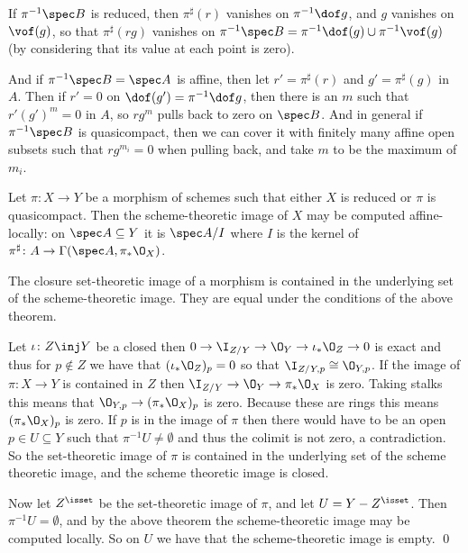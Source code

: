 If $\pi^{-1}\spec B$ is reduced, then $\pi^\sharp(r)$ vanishes on $\pi^{-1}\dof g$, and $g$ vanishes on
$\vof(g)$, so that $\pi^\sharp(rg)$ vanishes on $\pi^{-1}\spec B=\pi^{-1}\dof(g)\cup\pi^{-1}\vof(g)$
(by considering that its value at each point is zero).

And if $\pi^{-1}\spec B=\spec A$ is affine, then let $r'=\pi^\sharp(r)$ and $g'=\pi^\sharp(g)$ in $A$.
Then if $r'=0$ on $\dof(g')=\pi^{-1}\dof g$, then there is an $m$ such that $r'(g')^m=0$ in $A$, so $rg^m$
pulls back to zero on $\spec B$.
And in general if $\pi^{-1}\spec B$ is quasicompact, then we can cover it with finitely many affine open
subsets such that $rg^{m_i}=0$ when pulling back, and take $m$ to be the maximum of $m_i$.

\bthrm

    Let $\pi\colon X\to Y$ be a morphism of schemes such that either $X$ is reduced or $\pi$ is quasicompact.
    Then the scheme-theoretic image of $X$ may be computed affine-locally: on $\spec A\subseteq Y$ it
    is $\spec A/I$ where $I$ is the kernel of $\pi^\sharp\colon A\to\Gamma(\spec A,\pi_*\O_X)$.

\ethrm

\bcoro

    The closure set-theoretic image of a morphism is contained in the underlying set of the scheme-theoretic
    image.
    They are equal under the conditions of the above theorem.

\ecoro

\bproof

    Let $\iota\colon Z\inj Y$ be a closed then $0\to\I_{Z/Y}\to\O_Y\to\iota_*\O_Z\to0$ is exact and thus
    for $p\notin Z$ we have that $(\iota_*\O_Z)_p=0$ so that $\I_{Z/Y,p}\cong\O_{Y,p}$.
    If the image of $\pi\colon X\to Y$ is contained in $Z$ then $\I_{Z/Y}\to\O_Y\to\pi_*\O_X$ is zero.
    Taking stalks this means that $\O_{Y,p}\to(\pi_*\O_X)_p$ is zero.
    Because these are rings this means $(\pi_*\O_X)_p$ is zero.
    If $p$ is in the image of $\pi$ then there would have to be an open $p\in U\subseteq Y$ such that
    $\pi^{-1}U\neq\emptyset$ and thus the colimit is not zero, a contradiction.
    So the set-theoretic image of $\pi$ is contained in the underlying set of the scheme theoretic image,
    and the scheme theoretic image is closed.

    Now let $Z^\isset$ be the set-theoretic image of $\pi$, and let $U=Y-Z^\isset$.
    Then $\pi^{-1}U=\emptyset$, and by the above theorem the scheme-theoretic image may be computed locally.
    So on $U$ we have that the scheme-theoretic image is empty.
    \qed

